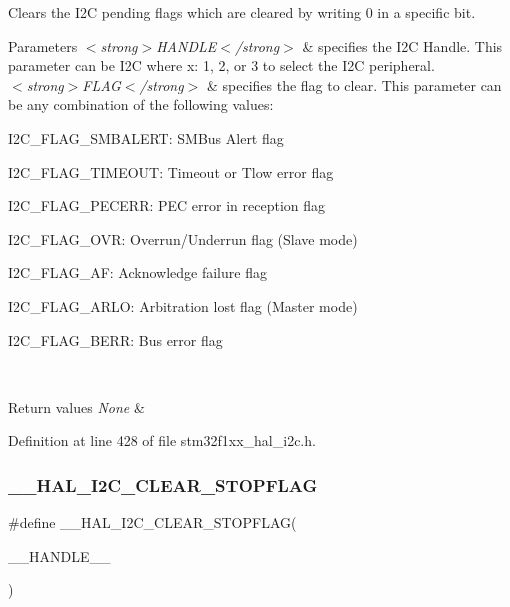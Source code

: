 Clears the I2C pending flags which are cleared by writing 0 in a specific bit. 


\begin{DoxyParams}{Parameters}
{\em $<$strong$>$\+H\+A\+N\+D\+L\+E$<$/strong$>$} & specifies the I2C Handle. This parameter can be I2C where x\+: 1, 2, or 3 to select the I2C peripheral. \\
\hline
{\em $<$strong$>$\+F\+L\+A\+G$<$/strong$>$} & specifies the flag to clear. This parameter can be any combination of the following values\+: \begin{DoxyItemize}
\item I2\+C\+\_\+\+F\+L\+A\+G\+\_\+\+S\+M\+B\+A\+L\+E\+RT\+: S\+M\+Bus Alert flag \item I2\+C\+\_\+\+F\+L\+A\+G\+\_\+\+T\+I\+M\+E\+O\+UT\+: Timeout or Tlow error flag \item I2\+C\+\_\+\+F\+L\+A\+G\+\_\+\+P\+E\+C\+E\+RR\+: P\+EC error in reception flag \item I2\+C\+\_\+\+F\+L\+A\+G\+\_\+\+O\+VR\+: Overrun/\+Underrun flag (Slave mode) \item I2\+C\+\_\+\+F\+L\+A\+G\+\_\+\+AF\+: Acknowledge failure flag \item I2\+C\+\_\+\+F\+L\+A\+G\+\_\+\+A\+R\+LO\+: Arbitration lost flag (Master mode) \item I2\+C\+\_\+\+F\+L\+A\+G\+\_\+\+B\+E\+RR\+: Bus error flag \end{DoxyItemize}
\\
\hline
\end{DoxyParams}

\begin{DoxyRetVals}{Return values}
{\em None} & \\
\hline
\end{DoxyRetVals}


Definition at line 428 of file stm32f1xx\+\_\+hal\+\_\+i2c.\+h.

\mbox{\label{group___i2_c___exported___macros_gae8e94c16809df16411862b11fea781db}} 
\subsubsection{\texorpdfstring{\+\_\+\+\_\+\+H\+A\+L\+\_\+\+I2\+C\+\_\+\+C\+L\+E\+A\+R\+\_\+\+S\+T\+O\+P\+F\+L\+AG}{\_\_HAL\_I2C\_CLEAR\_STOPFLAG}}
{\footnotesize\ttfamily \#define \+\_\+\+\_\+\+H\+A\+L\+\_\+\+I2\+C\+\_\+\+C\+L\+E\+A\+R\+\_\+\+S\+T\+O\+P\+F\+L\+AG(\begin{DoxyParamCaption}\item[{}]{\+\_\+\+\_\+\+H\+A\+N\+D\+L\+E\+\_\+\+\_\+ }\end{DoxyParamCaption})}

